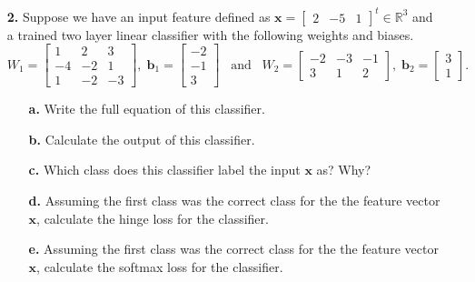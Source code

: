 \documentclass[ 12pt ]{article}
\begin{document}
\begin{enumerate}
	\item[\textbf{2.}] Suppose we have an input feature defined as $\textbf{x} = \begin{bmatrix} 2 & -5 & 1 \end{bmatrix}^t \in \mathbb{R}^3$ and a trained two layer linear classifier
		with the following weights and biases. $$W_1 = \begin{bmatrix} 1 & 2 & 3 \\ -4 & -2 & 1 \\ 1 & -2 & -3 \end{bmatrix},\; \textbf{b}_1 = \begin{bmatrix} -2 \\ -1 \\ 3
		\end{bmatrix}\;\;\; \mathrm{and}\;\;\; W_2 = \begin{bmatrix} -2 & -3 & -1 \\ 3 & 1 & 2 \end{bmatrix},\; \textbf{b}_2 = \begin{bmatrix} 3 \\ 1 \end{bmatrix}.$$
		\begin{enumerate}
			\item[\textbf{a.}] Write the full equation of this classifier.
			\item[\textbf{b.}] Calculate the output of this classifier.
			\item[\textbf{c.}] Which class does this classifier label the input $\textbf{x}$ as? Why?
			\item[\textbf{d.}] Assuming the first class was the correct class for the the feature vector $\textbf{x}$, calculate the hinge loss for the classifier.
			\item[\textbf{e.}] Assuming the first class was the correct class for the the feature vector $\textbf{x}$, calculate the softmax loss for the classifier.
		\end{enumerate}


\end{enumerate}
\end{document}
